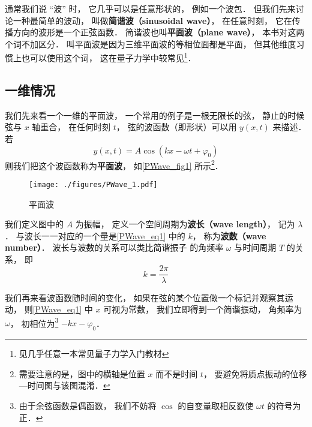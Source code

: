 

通常我们说 “波” 时， 它几乎可以是任意形状的， 例如一个波包． 但我们先来讨论一种最简单的波动， 叫做\textbf{简谐波（sinusoidal wave）}， 在任意时刻， 它在传播方向的波形是一个正弦函数． 简谐波也叫\textbf{平面波（plane wave）}， 本书对这两个词不加区分． 叫平面波是因为三维平面波的等相位面都是平面， 但其他维度习惯上也可以使用这个词， 这在量子力学中较常见\footnote{见几乎任意一本常见量子力学入门教材}．

\subsection{一维情况}
我们先来看一个一维的平面波， 一个常用的例子是一根无限长的弦， 静止的时候弦与 $x$ 轴重合， 在任何时刻 $t$， 弦的波函数（即形状）可以用 $y(x, t)$ 来描述． 若
\begin{equation}\label{PWave_eq1}
y(x, t) = A\cos(k x - \omega t + \varphi_0)
\end{equation}
则我们把这个波函数称为\textbf{平面波}， 如\autoref{PWave_fig1} 所示\footnote{需要注意的是，图中的横轴是位置 $x$ 而不是时间 $t$， 要避免将质点振动的位移—时间图与该图混淆．}．

\begin{figure}[ht]
\centering
\texttt{[image: ./figures/PWave\_1.pdf]}
\caption{平面波} \label{PWave_fig1}
\end{figure}

我们定义图中的 $A$ 为振幅， 定义一个空间周期为\textbf{波长（wave length）}， 记为 $\lambda$． 与波长一一对应的一个量是\autoref{PWave_eq1} 中的 $k$， 称为\textbf{波数（wave number）}． 波长与波数的关系可以类比简谐振子 的角频率 $\omega$ 与时间周期 $T$ 的关系， 即
\begin{equation}
k = \frac{2\pi}{\lambda}
\end{equation}

我们再来看波函数随时间的变化， 如果在弦的某个位置做一个标记并观察其运动， 则\autoref{PWave_eq1} 中 $x$ 可视为常数， 我们立即得到一个简谐振动， 角频率为 $\omega$， 初相位为\footnote{由于余弦函数是偶函数， 我们不妨将 $\cos$ 的自变量取相反数使 $\omega t$ 的符号为正．} $-kx - \varphi_0$．

